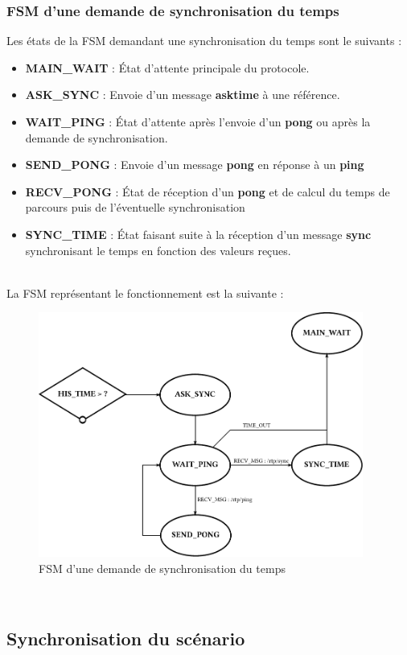 \subsubsection{FSM d'une demande de synchronisation du temps}
Les états de la FSM demandant une synchronisation du temps sont le suivants :
\begin{itemize}
\item \textbf{MAIN\_WAIT} : État d'attente principale du protocole.
\item \textbf{ASK\_SYNC} : Envoie d'un message \textbf{asktime} à une référence.
\item \textbf{WAIT\_PING} : État d'attente après l'envoie d'un \textbf{pong} ou après la demande de synchronisation.
\item \textbf{SEND\_PONG} : Envoie d'un message \textbf{pong} en réponse à un \textbf{ping}
\item \textbf{RECV\_PONG} : État de réception d'un \textbf{pong} et de calcul du temps de parcours puis de l'éventuelle synchronisation
\item \textbf{SYNC\_TIME} : État faisant suite à la réception d'un message \textbf{sync} synchronisant le temps en fonction des valeurs reçues. 
\end{itemize}~\\
La FSM représentant le fonctionnement est la suivante :~\\
\begin{figure}[htbp]
  \centering
  \includegraphics[width=0.95\textwidth]{figs/fsm_sync_ask.pdf}
  \caption{FSM d'une demande de synchronisation du temps}
  \label{fig:fsm_time_ref}
  \vspace{-17pt}
\end{figure}~\\

\subsection{Synchronisation du scénario}


   
\newpage
\nocite{*}
%
%
\printbibliography


